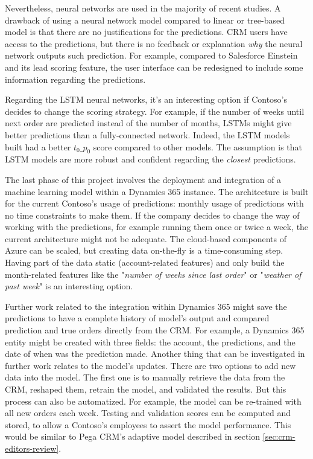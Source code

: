 Nevertheless, neural networks are used in the majority of recent studies. A drawback of using a neural network model compared to linear or tree-based model is that there are no justifications for the predictions. CRM users have access to the predictions, but there is no feedback or explanation \textit{why} the neural network outputs such prediction. For example, compared to Salesforce Einstein and its lead scoring feature, the user interface can be redesigned to include some information regarding the predictions.

Regarding the LSTM neural networks, it's an interesting option if Contoso's decides to change the scoring strategy. For example, if the number of weeks until next order are predicted instead of the number of months, LSTMs might give better predictions than a fully-connected network. Indeed, the LSTM models built had a better $t_0\_p_0$ score compared to other models. The assumption is that LSTM models are more robust and confident regarding the \textit{closest} predictions.

The last phase of this project involves the deployment and integration of a machine learning model within a Dynamics 365 instance. The architecture is built for the current Contoso's usage of predictions: monthly usage of predictions with no time constraints to make them. If the company decides to change the way of working with the predictions, for example running them once or twice a week, the current architecture might not be adequate. The cloud-based components of Azure can be scaled, but creating data on-the-fly is a time-consuming step. Having part of the data static (account-related features) and only build the month-related features like the "\textit{number of weeks since last order}" or "\textit{weather of past week}" is an interesting option.

Further work related to the integration within Dynamics 365 might save the predictions to have a complete history of model's output and compared prediction and true orders directly from the CRM. For example, a Dynamics 365 entity might be created with three fields: the account, the predictions, and the date of when was the prediction made. 
Another thing that can be investigated in further work relates to the model's updates. There are two options to add new data into the model. The first one is to manually retrieve the data from the CRM, reshaped them, retrain the model, and validated the results. But this process can also be automatized. For example, the model can be re-trained with all new orders each week. Testing and validation scores can be computed and stored, to allow a Contoso's employees to assert the model performance. This would be similar to Pega CRM's adaptive model described in section \ref{sec:crm-editors-review}.